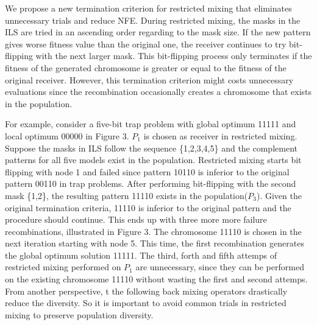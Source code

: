 \documentclass{sig-alternate-05-2015}
\begin{document}
We propose a new termination criterion for restricted mixing that eliminates unnecessary trials and reduce NFE. During restricted mixing, the masks in the ILS are tried in an ascending order regarding to the mask size. If the new pattern gives worse fitness value than the original one, the receiver continues to try bit-flipping with the next larger mask. This bit-flipping process only terminates if the fitness of the generated chromosome is greater or equal to the fitness of the original receiver. However, this termination criterion might costs unnecessary evaluations since the recombination occasionally creates a chromosome that exists in the population. 

For example, consider a five-bit trap problem with global optimum 11111 and local optimum 00000 in Figure 3. $P_{1}$ is chosen as receiver in restricted mixing. Suppose the masks in ILS follow the sequence \{1,2,3,4,5\} and the complement patterns for all five models exist in the population. Restricted mixing starts bit flipping with node 1 and failed since pattern 10110 is inferior to the original pattern 00110 in trap problems. After performing bit-flipping with the second mask \{1,2\}, the resulting pattern 11110 exists in the population($P_{3}$). Given the original termination criteria, 11110 is inferior to the original pattern and the procedure should continue. This ends up with three more more failure recombinations, illustrated in Figure 3. The chromosome 11110 is chosen in the next iteration starting with node 5. This time, the first recombination generates the global optimum solution 11111. The third, forth and fifth attemps of restricted mixing performed on $P_{1}$ are unnecessary, since they can be performed on the existing chromosome 11110 without wasting the first and second attemps. From another perspective, t the following back mixing operators drastically reduce the diversity. So it is important to avoid common trials in restricted mixing to preserve population diversity.   
\end{document}
